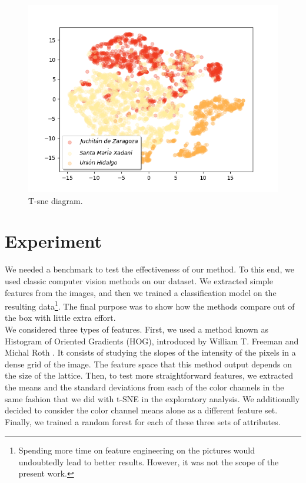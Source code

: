 \begin{figure}[!h]
  \centering
  \includegraphics[width=1\textwidth]{images/t-sne-bis.png}
  \caption{T-sne diagram.}
  \label{fig:tsne}
\end{figure}

\section{Experiment}

We needed a benchmark to test the effectiveness of our method. To this end, we used classic computer vision methods on our dataset. We extracted simple features from the images, and then we trained a classification model on the resulting data\footnote{Spending more time on feature engineering on the pictures would undoubtedly lead to better results. However, it was not the scope of the present work.}. The final purpose was to show how the methods compare out of the box with little extra effort.\\

We considered three types of features. First, we used a method known as Histogram of Oriented Gradients (HOG), introduced by William T. Freeman and Michal Roth \cite{MERL_TR94-03}. It consists of studying the slopes of the intensity of the pixels in a dense grid of the image. The feature space that this method output depends on the size of the lattice. Then, to test more straightforward features, we extracted the means and the standard deviations from each of the color channels in the same fashion that we did with t-SNE in the exploratory analysis. We additionally decided to consider the color channel means alone as a different feature set. Finally, we trained a random forest for each of these three sets of attributes.\\

